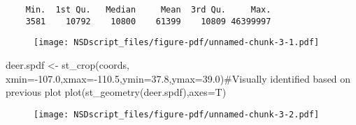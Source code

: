 \documentclass[
  letterpaper,
]{book}
\newenvironment{Shaded}{\begin{snugshade}}{\end{snugshade}}
\newcommand{\AttributeTok}[1]{\textcolor[rgb]{0.40,0.45,0.13}{#1}}
\newcommand{\CommentTok}[1]{\textcolor[rgb]{0.37,0.37,0.37}{#1}}
\newcommand{\DecValTok}[1]{\textcolor[rgb]{0.68,0.00,0.00}{#1}}
\newcommand{\FloatTok}[1]{\textcolor[rgb]{0.68,0.00,0.00}{#1}}
\newcommand{\FunctionTok}[1]{\textcolor[rgb]{0.28,0.35,0.67}{#1}}
\newcommand{\NormalTok}[1]{\textcolor[rgb]{0.00,0.23,0.31}{#1}}
\newcommand{\OtherTok}[1]{\textcolor[rgb]{0.00,0.23,0.31}{#1}}
\newcommand{\SpecialCharTok}[1]{\textcolor[rgb]{0.37,0.37,0.37}{#1}}
\newcommand{\StringTok}[1]{\textcolor[rgb]{0.13,0.47,0.30}{#1}}
\begin{document}
\begin{verbatim}
    Min.  1st Qu.   Median     Mean  3rd Qu.     Max. 
    3581    10792    10800    61399    10809 46399997 
\end{verbatim}

\begin{Shaded}
\end{Shaded}

\begin{figure}[H]

{\centering \texttt{[image: NSDscript\_files/figure-pdf/unnamed-chunk-3-1.pdf]}

}

\end{figure}

\begin{Shaded}
\begin{Highlighting}[]
\NormalTok{deer.spdf }\OtherTok{\textless{}{-}} \FunctionTok{st\_crop}\NormalTok{(coords, }\AttributeTok{xmin=}\SpecialCharTok{{-}}\FloatTok{107.0}\NormalTok{,}\AttributeTok{xmax=}\SpecialCharTok{{-}}\FloatTok{110.5}\NormalTok{,}\AttributeTok{ymin=}\FloatTok{37.8}\NormalTok{,}\AttributeTok{ymax=}\FloatTok{39.0}\NormalTok{)}\CommentTok{\#Visually identified based on previous plot}
\FunctionTok{plot}\NormalTok{(}\FunctionTok{st\_geometry}\NormalTok{(deer.spdf),}\AttributeTok{axes=}\NormalTok{T)}
\end{Highlighting}
\end{Shaded}

\begin{figure}[H]

{\centering \texttt{[image: NSDscript\_files/figure-pdf/unnamed-chunk-3-2.pdf]}

}

\end{figure}
\end{document}
